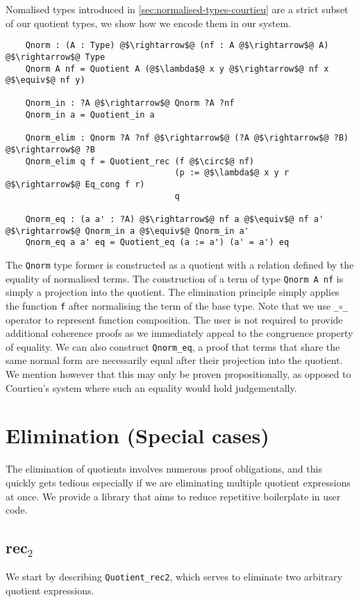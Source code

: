 \documentclass[12pt,twoside,maitrise]{dms}
\theoremstyle{definition}
\numberwithin{equation}{section}
\numberwithin{table}{chapter}
\numberwithin{figure}{chapter}
\newcommand\id[1] {\texttt{#1}}
\newcommand\fn[1] {\texttt{#1}}
\begin{document}
Nomalised types introduced in \autoref{sec:normalised-types-courtieu} are a
strict subset of our quotient types, we show how we encode them in our system.

\begin{verbatim}
    Qnorm : (A : Type) @$\rightarrow$@ (nf : A @$\rightarrow$@ A) @$\rightarrow$@ Type
    Qnorm A nf = Quotient A (@$\lambda$@ x y @$\rightarrow$@ nf x @$\equiv$@ nf y)

    Qnorm_in : ?A @$\rightarrow$@ Qnorm ?A ?nf
    Qnorm_in a = Quotient_in a

    Qnorm_elim : Qnorm ?A ?nf @$\rightarrow$@ (?A @$\rightarrow$@ ?B) @$\rightarrow$@ ?B
    Qnorm_elim q f = Quotient_rec (f @$\circ$@ nf)
                                  (p := @$\lambda$@ x y r @$\rightarrow$@ Eq_cong f r)
                                  q

    Qnorm_eq : (a a' : ?A) @$\rightarrow$@ nf a @$\equiv$@ nf a' @$\rightarrow$@ Qnorm_in a @$\equiv$@ Qnorm_in a'
    Qnorm_eq a a' eq = Quotient_eq (a := a') (a' = a') eq
\end{verbatim}

The \id{Qnorm} type former is constructed as a quotient with a relation defined
by the equality of normalised terms. The construction of a term of type
\id{Qnorm A nf} is simply a projection into the quotient. The elimination
principle simply applies the function \id{f} after normalising the term of the
base type. Note that we use \fn{_$\circ$_} operator to represent function
composition. The user is not required to provide additional coherence proofs as
we immediately appeal to the congruence property of equality. We can also
construct \id{Qnorm\_eq}, a proof that terms that share the same normal form are
necessarily equal after their projection into the quotient. We mention however
that this may only be proven propositionally, as opposed to Courtieu's system
where such an equality would hold judgementally.

\section{Elimination (Special cases)}

The elimination of quotients involves numerous proof obligations, and this
quickly gets tedious especially if we are eliminating multiple quotient
expressions at once. We provide a library that aims to reduce repetitive
boilerplate in user code.

\subsection*{rec$_2$}\label{sec:rec2}
We start by describing \id{Quotient\_rec2}, which serves to eliminate two arbitrary quotient expressions.
\end{document}
